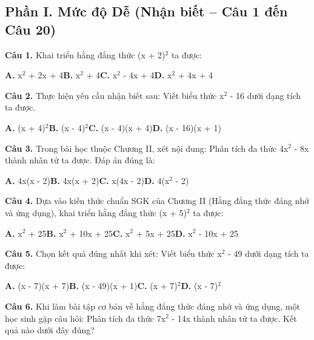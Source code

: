 \documentclass[11pt,a4paper]{article}
\begin{document}
\subsection*{\color{accent} Phần I. Mức độ Dễ (Nhận biết -- Câu 1 đến Câu 20)}
\textbf{\color{primary} Câu 1.} Khai triển hằng đẳng thức (x + 2)$^2$ ta được:\par
\hspace*{1.5em}\textbf{A.} x$^2$ + 2x + 4\quad\quad \textbf{B.} x$^2$ + 4\quad\quad \textbf{C.} x$^2$ - 4x + 4\quad\quad \textbf{D.} x$^2$ + 4x + 4\par\vspace{2pt}
\textbf{\color{primary} Câu 2.} Thực hiện yêu cầu nhận biết sau: Viết biểu thức x$^2$ - 16 dưới dạng tích ta được.\par
\hspace*{1.5em}\textbf{A.} (x + 4)$^2$\quad\quad \textbf{B.} (x - 4)$^2$\quad\quad \textbf{C.} (x - 4)(x + 4)\quad\quad \textbf{D.} (x - 16)(x + 1)\par\vspace{2pt}
\textbf{\color{primary} Câu 3.} Trong bài học thuộc Chương II, xét nội dung: Phân tích đa thức 4x$^2$ - 8x thành nhân tử ta được. Đáp án đúng là:\par
\hspace*{1.5em}\textbf{A.} 4x(x - 2)\quad\quad \textbf{B.} 4x(x + 2)\quad\quad \textbf{C.} x(4x - 2)\quad\quad \textbf{D.} 4(x$^2$ - 2)\par\vspace{2pt}
\textbf{\color{primary} Câu 4.} Dựa vào kiến thức chuẩn SGK của Chương II (Hằng đẳng thức đáng nhớ và ứng dụng), khai triển hằng đẳng thức (x + 5)$^2$ ta được:\par
\hspace*{1.5em}\textbf{A.} x$^2$ + 25\quad\quad \textbf{B.} x$^2$ + 10x + 25\quad\quad \textbf{C.} x$^2$ + 5x + 25\quad\quad \textbf{D.} x$^2$ - 10x + 25\par\vspace{2pt}
\textbf{\color{primary} Câu 5.} Chọn kết quả đúng nhất khi xét: Viết biểu thức x$^2$ - 49 dưới dạng tích ta được:\par
\hspace*{1.5em}\textbf{A.} (x - 7)(x + 7)\quad\quad \textbf{B.} (x - 49)(x + 1)\quad\quad \textbf{C.} (x + 7)$^2$\quad\quad \textbf{D.} (x - 7)$^2$\par\vspace{2pt}
\textbf{\color{primary} Câu 6.} Khi làm bài tập cơ bản về hằng đẳng thức đáng nhớ và ứng dụng, một học sinh gặp câu hỏi: Phân tích đa thức 7x$^2$ - 14x thành nhân tử ta được. Kết quả nào dưới đây đúng?\par
\end{document}
